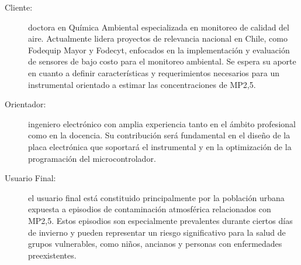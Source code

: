 %
%
%
% 
\begin{description}
\item [Cliente:] doctora en Química Ambiental especializada en monitoreo de calidad del aire. Actualmente lidera proyectos de relevancia nacional en Chile, como Fodequip Mayor y Fodecyt, enfocados en la implementación y evaluación de sensores de bajo costo para el monitoreo ambiental. Se espera su aporte en cuanto a definir características y requerimientos necesarios para un instrumental orientado a estimar las concentraciones de MP2,5.
\item [Orientador:] ingeniero electrónico con amplia experiencia tanto en el ámbito profesional como en la docencia. Su contribución será fundamental en el diseño de la placa electrónica que soportará el instrumental y en la optimización de la programación del microcontrolador.

\item [Usuario Final:] el usuario final está constituido principalmente por la población urbana expuesta a episodios de contaminación atmosférica relacionados con MP2,5. Estos episodios son especialmente prevalentes durante ciertos días de invierno y pueden representar un riesgo significativo para la salud de grupos vulnerables, como niños, ancianos y personas con enfermedades preexistentes.
\end{description}
%
